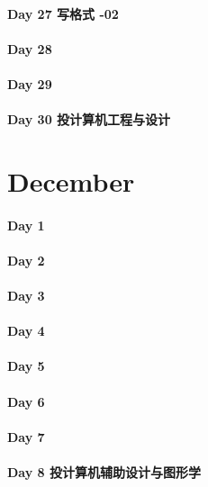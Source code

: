 \documentclass[UTF8,a4paper,8pt]{ctexart}
\begin{document}
 	 \paragraph{Day 27  写格式 -02     \quad     }
 	 \paragraph{Day 28      \quad     }
 	 \paragraph{Day 29      \quad     }   
 	 \paragraph{Day 30  投计算机工程与设计    \quad     }
 \section{December}
 	 \paragraph{Day 1       \quad     }
 	 \paragraph{Day 2       \quad     }
 	 \paragraph{Day 3       \quad     }
 	 \paragraph{Day 4       \quad     }
 	 \paragraph{Day 5       \quad     }
 	 \paragraph{Day 6       \quad     }
 	 \paragraph{Day 7       \quad     }
 	 \paragraph{Day 8   投计算机辅助设计与图形学    \quad     }
\end{document}
